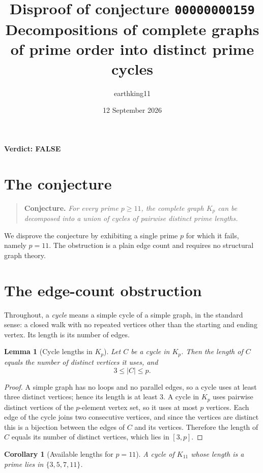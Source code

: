 \documentclass[11pt]{article}
\title{Disproof of conjecture \texttt{00000000159}\\
\large Decompositions of complete graphs of prime order into distinct prime cycles}
\author{earthking11}
\date{12 September 2026}
\newtheorem{lemma}[theorem]{Lemma}
\newtheorem{corollary}[theorem]{Corollary}
\theoremstyle{definition}
\theoremstyle{remark}
\begin{document}
\maketitle

\begin{center}
\textbf{Verdict: FALSE}
\end{center}

\section{The conjecture}

\begin{quote}
\textbf{Conjecture.} \emph{For every prime $p \ge 11$, the complete graph
$K_p$ can be decomposed into a union of cycles of pairwise distinct prime
lengths.}
\end{quote}

We disprove the conjecture by exhibiting a single prime $p$ for which it fails,
namely $p = 11$. The obstruction is a plain edge count and requires no
structural graph theory.

\section{The edge-count obstruction}

Throughout, a \emph{cycle} means a simple cycle of a simple graph, in the
standard sense: a closed walk with no repeated vertices other than the starting
and ending vertex. Its length is its number of edges.

\begin{lemma}[Cycle lengths in $K_p$]
\label{lem:length}
Let $C$ be a cycle in $K_p$. Then the length of $C$ equals the number of
distinct vertices it uses, and
\[
3 \le \lvert C \rvert \le p .
\]
\end{lemma}

\begin{proof}
A simple graph has no loops and no parallel edges, so a cycle uses at least
three distinct vertices; hence its length is at least $3$. A cycle in $K_p$
uses pairwise distinct vertices of the $p$-element vertex set, so it uses at
most $p$ vertices. Each edge of the cycle joins two consecutive vertices, and
since the vertices are distinct this is a bijection between the edges of $C$
and its vertices. Therefore the length of $C$ equals its number of distinct
vertices, which lies in $[3, p]$.
\end{proof}

\begin{corollary}[Available lengths for $p = 11$]
\label{cor:lengths}
A cycle of $K_{11}$ whose length is a prime lies in $\{3,5,7,11\}$.
\end{corollary}
\end{document}
